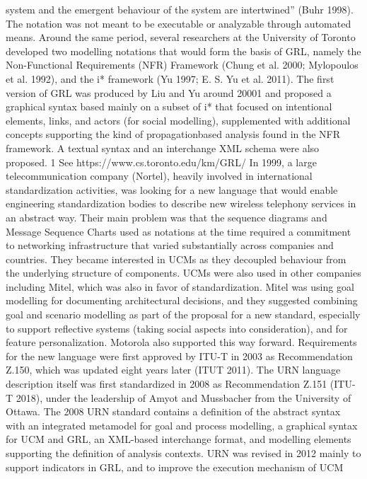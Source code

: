 system and the emergent behaviour of the system
are intertwined” (Buhr 1998). The notation was
not meant to be executable or analyzable through
automated means.
Around the same period, several researchers
at the University of Toronto developed two modelling notations that would form the basis of GRL,
namely the Non-Functional Requirements (NFR)
Framework (Chung et al. 2000; Mylopoulos et al.
1992), and the i* framework (Yu 1997; E. S. Yu et
al. 2011). The first version of GRL was produced
by Liu and Yu around 20001 and proposed a graphical syntax based mainly on a subset of i* that
focused on intentional elements, links, and actors
(for social modelling), supplemented with additional concepts supporting the kind of propagationbased analysis found in the NFR framework. A
textual syntax and an interchange XML schema
were also proposed.
1 See https://www.cs.toronto.edu/km/GRL/
In 1999, a large telecommunication company
(Nortel), heavily involved in international standardization activities, was looking for a new language
that would enable engineering standardization bodies to describe new wireless telephony services
in an abstract way. Their main problem was that
the sequence diagrams and Message Sequence
Charts used as notations at the time required a
commitment to networking infrastructure that varied substantially across companies and countries.
They became interested in UCMs as they decoupled behaviour from the underlying structure of
components. UCMs were also used in other companies including Mitel, which was also in favor of
standardization. Mitel was using goal modelling
for documenting architectural decisions, and they
suggested combining goal and scenario modelling
as part of the proposal for a new standard, especially to support reflective systems (taking social
aspects into consideration), and for feature personalization. Motorola also supported this way
forward.
Requirements for the new language were first
approved by ITU-T in 2003 as Recommendation
Z.150, which was updated eight years later (ITUT 2011). The URN language description itself
was first standardized in 2008 as Recommendation Z.151 (ITU-T 2018), under the leadership of
Amyot and Mussbacher from the University of
Ottawa. The 2008 URN standard contains a definition of the abstract syntax with an integrated metamodel for goal and process modelling, a graphical
syntax for UCM and GRL, an XML-based interchange format, and modelling elements supporting
the definition of analysis contexts. URN was revised in 2012 mainly to support indicators in GRL,
and to improve the execution mechanism of UCM

